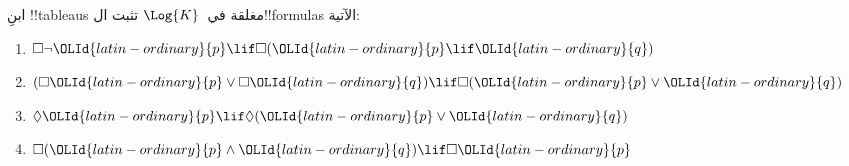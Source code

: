 \documentclass[../../../include/open-logic-section]{subfiles}
\begin{document}
\begin{prob}
  ابنِ !!{tableau}s مغلقة في~$\Log{K}$ تثبت ال!!{formula}s الآتية:
  \begin{enumerate}
    \item $\Box \lnot \OLId{latin-ordinary}{p} \lif \Box(\OLId{latin-ordinary}{p} \lif \OLId{latin-ordinary}{q})$
    \item $(\Box \OLId{latin-ordinary}{p} \lor \Box \OLId{latin-ordinary}{q}) \lif \Box(\OLId{latin-ordinary}{p} \lor \OLId{latin-ordinary}{q})$
    \item $\Diamond \OLId{latin-ordinary}{p} \lif \Diamond(\OLId{latin-ordinary}{p} \lor \OLId{latin-ordinary}{q})$
    \item $\Box(\OLId{latin-ordinary}{p} \land \OLId{latin-ordinary}{q}) \lif \Box \OLId{latin-ordinary}{p}$
  \end{enumerate}
\end{prob}
\end{document}
